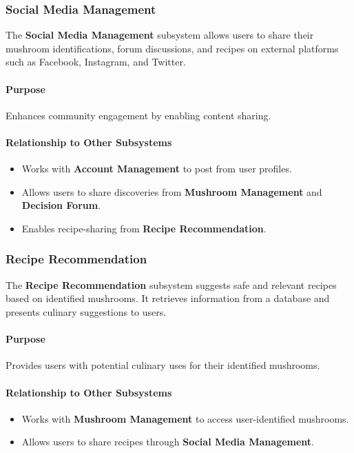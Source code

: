 \documentclass[]{article}
\begin{document}
\subsubsection{Social Media Management}
The \textbf{Social Media Management} subsystem allows users to share their mushroom identifications, forum discussions, and recipes on external platforms such as Facebook, Instagram, and Twitter.
 
\paragraph{Purpose}
Enhances community engagement by enabling content sharing.
 
\paragraph{Relationship to Other Subsystems}
\begin{itemize}
    \item Works with \textbf{Account Management} to post from user profiles.
    \item Allows users to share discoveries from \textbf{Mushroom Management} and \textbf{Decision Forum}.
    \item Enables recipe-sharing from \textbf{Recipe Recommendation}.
\end{itemize}
 
\subsubsection{Recipe Recommendation}
The \textbf{Recipe Recommendation} subsystem suggests safe and relevant recipes based on identified mushrooms. It retrieves information from a database and presents culinary suggestions to users.
 
\paragraph{Purpose}
Provides users with potential culinary uses for their identified mushrooms.
 
\paragraph{Relationship to Other Subsystems}
\begin{itemize}
    \item Works with \textbf{Mushroom Management} to access user-identified mushrooms.
    \item Allows users to share recipes through \textbf{Social Media Management}.
\end{itemize}
\end{document}
